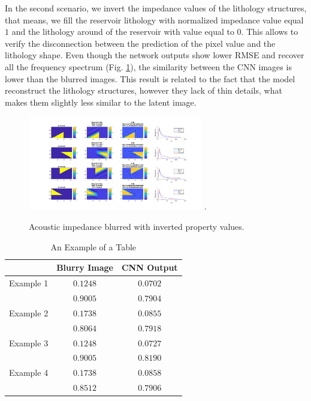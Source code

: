 \documentclass[conference,compsoc]{IEEEtran}
\begin{document}
In the second scenario, we invert the impedance values of the lithology structures, that means,
we fill the reservoir lithology with normalized impedance value equal $1$ and the lithology
around of the reservoir with value equal to $0$. This allows to verify the disconnection between the prediction
of the pixel value and the lithology shape.
Even though the network outputs show lower RMSE and recover all the frequency spectrum (Fig. \ref{fig_scenario6}), the similarity
between the CNN images is lower than the blurred images.
This result is related to the fact that the model reconstruct the lithology structures, however they lack of thin
details, what makes them slightly less similar to the latent image.
\begin{figure}[!t]
\centering
\includegraphics[width=3.0in]{Figs/Caso6}
\DeclareGraphicsExtensions.
\caption{Acoustic impedance blurred with inverted property values.}
\label{fig_scenario6}
\end{figure}

\begin{table}[!t]
\renewcommand{\arraystretch}{1.3}
\caption{An Example of a Table}
\label{table_caso_2}
\centering
\begin{tabular}{|c||c||c|}
\hline
 & Blurry Image & CNN Output \\
\hline
Example 1 & $0.1248$ & $0.0702$\\
\hline
	  & $0.9005$ & $0.7904$\\
\hline
Example 2 & $0.1738$ & $0.0855$ \\
\hline
	  & $0.8064$ & $0.7918$\\
\hline
Example 3 & $0.1248$ & $0.0727$\\
\hline
	  & $0.9005$ & $0.8190$\\
\hline
Example 4 & $0.1738$ & $0.0858$\\
\hline
	  & $0.8512$ & $0.7906$\\
\hline
\end{tabular}
\end{table}
\end{document}
